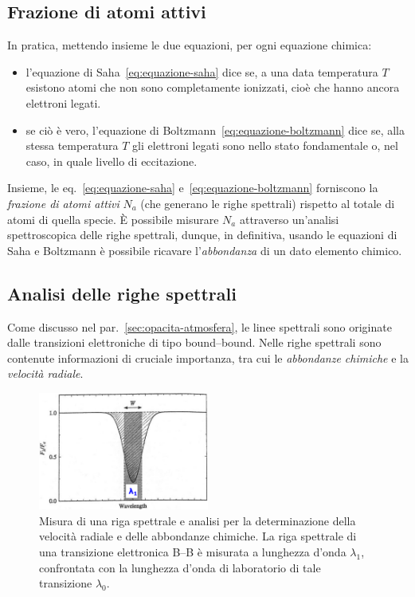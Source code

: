 \subsection{Frazione di atomi attivi}\label{sec:frazione-atomi-attivi}
In pratica, mettendo insieme le due equazioni, per ogni equazione chimica:
\begin{itemize}
    \item l'equazione di Saha~\eqref{eq:equazione-saha} dice se, a una data temperatura $T$ esistono atomi che non sono completamente ionizzati, cioè che hanno ancora elettroni legati.
    \item se ciò è vero, l'equazione di Boltzmann~\eqref{eq:equazione-boltzmann} dice se, alla stessa temperatura $T$ gli elettroni legati sono nello stato fondamentale o, nel caso, in quale livello di eccitazione.
\end{itemize}
Insieme, le eq.~\eqref{eq:equazione-saha} e~\eqref{eq:equazione-boltzmann} forniscono la \emph{frazione di atomi attivi} $N_a$ (che generano le righe spettrali) rispetto al totale di atomi di quella specie. È possibile misurare $N_a$ attraverso un'analisi spettroscopica delle righe spettrali, dunque, in definitiva, usando le equazioni di Saha e Boltzmann è possibile ricavare l'\emph{abbondanza} di un dato elemento chimico. 

\subsection{Analisi delle righe spettrali}
Come discusso nel par.~\ref{sec:opacita-atmosfera}, le linee spettrali sono originate dalle transizioni elettroniche di tipo bound--bound. Nelle righe spettrali sono contenute informazioni di cruciale importanza, tra cui le \emph{abbondanze chimiche} e la \emph{velocità radiale}.

\begin{figure}
    \centering
    \includegraphics[width=0.5\textwidth]{immagini/righe-spettrali.png}
    \caption{Misura di una riga spettrale e analisi per la determinazione della velocità radiale e delle abbondanze chimiche. La riga spettrale di una transizione elettronica B--B è misurata a lunghezza d'onda $\lambda_1$, confrontata con la lunghezza d'onda di laboratorio di tale transizione $\lambda_0$.}
    \label{fig:righe-spettrali}
    
\end{figure}


